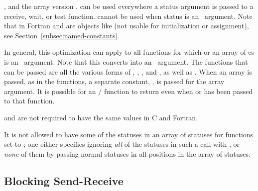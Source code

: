 , and the array version
, can be used everywhere a status argument is
passed to a receive, wait, or test function.  
cannot be used when status is an \IN\ argument.
Note that in Fortran  and  are
objects like  (not usable for initialization or
assignment), see Section~\ref{subsec:named-constants}.




In general, this optimization can apply to all functions for which
 or an array of es is an \OUT\ argument.
Note that this converts  into an \INOUT\ argument.
The functions that can be passed  are all the various forms of
,
,
, and , as well as
.
When an array is passed, as in the
functions, a separate constant, , is passed for
the array argument.
It is possible for an \MPI/ function to return 
even when  or  has
been passed to that function.



 and  are not
required to have the same values in C and Fortran.

It is not allowed to have some of the statuses in an array of statuses for
functions set to
; one either specifies ignoring \emph{all} of
the statuses in such a call with , or \emph{none}
of them by passing normal statuses in all positions in the array
of statuses.

\subsection{Blocking Send-Receive}
\label{sec:pt2pt-sendrecv}

